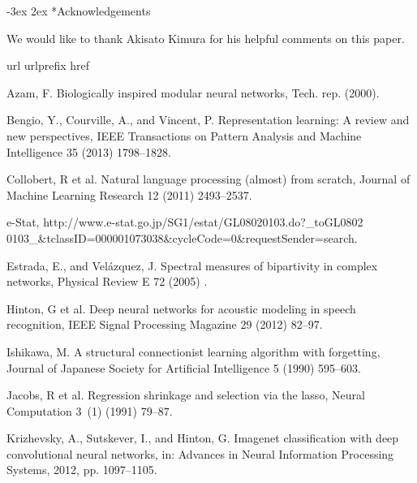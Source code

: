 \documentclass[12pt]{article} %
\makeatletter
\renewcommand\section{\@startsection {section}{1}%
{\z@}%
{-3ex}%
{2ex}%
{\normalfont\normalsize\bfseries}}
\makeatother
\begin{document}
\section*{Acknowledgements} %

We would like to thank Akisato Kimura for his helpful comments on this paper. 

\begin{thebibliography}{10}
\expandafter\ifx\csname url\endcsname\relax
  \def\url#1{\texttt{#1}}\fi
\expandafter\ifx\csname urlprefix\endcsname\relax\def\urlprefix{URL }\fi
\expandafter\ifx\csname href\endcsname\relax
  \def\href#1#2{#2} \def\path#1{#1}\fi

{Azam, F}. Biologically inspired modular neural networks, Tech. rep. (2000).

{Bengio, Y., Courville, A., and Vincent, P}. Representation learning: A review and
  new perspectives, IEEE Transactions on Pattern Analysis and Machine
  Intelligence 35 (2013) 1798--1828.
  \label{Bengio2013}

{Collobert, R et al}.
  Natural language processing (almost) from scratch, Journal of Machine
  Learning Research 12 (2011) 2493--2537.

e-{S}tat, http://www.e-stat.go.jp/SG1/estat/GL08020103.do?\_toGL0802\\
0103\_\&tclassID=000001073038\&cycleCode=0\&requestSender=search.

{Estrada, E., and Vel{\'a}zquez, J}. Spectral measures of bipartivity in complex
  networks, Physical Review E 72 (2005) {}.

{Hinton, G et al}. Deep neural networks
  for acoustic modeling in speech recognition, IEEE Signal Processing Magazine
  29 (2012) 82--97.

{Ishikawa, M}. A structural connectionist learning algorithm with forgetting,
  Journal of Japanese Society for Artificial Intelligence 5 (1990) 595--603.

{Jacobs, R et al}. Regression shrinkage and
  selection via the lasso, Neural Computation 3~(1) (1991) 79--87.

{Krizhevsky, A., Sutskever, I., and Hinton, G}. Imagenet classification with deep
  convolutional neural networks, in: Advances in Neural Information Processing
  Systems, 2012, pp. 1097--1105.


\end{thebibliography}
\end{document}
